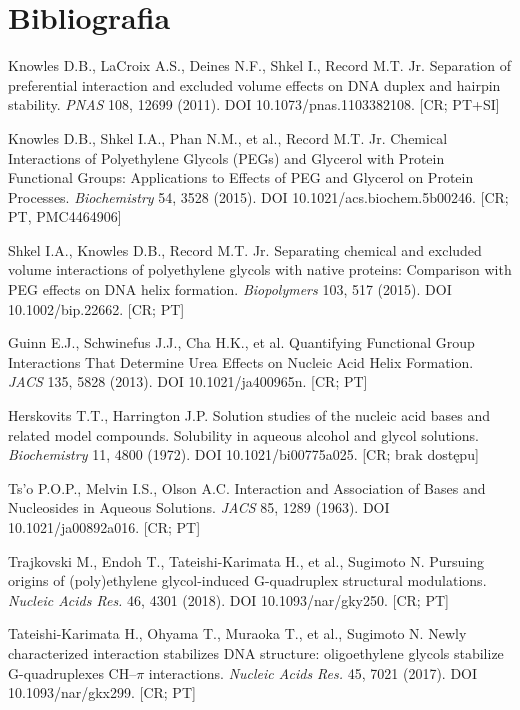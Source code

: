 \documentclass[10pt,a4paper]{article}
\begin{document}
\section*{Bibliografia}
\small
\begin{enumerate}[label={[\arabic*]},ref={\arabic*},leftmargin=*,itemsep=0pt]
\item\label{b:kn11} Knowles D.B., LaCroix A.S., Deines N.F., Shkel I., Record M.T. Jr. Separation of preferential interaction and excluded volume effects on DNA duplex and hairpin stability. \emph{PNAS} 108, 12699 (2011). DOI 10.1073/pnas.1103382108. [CR; PT+SI]
\item\label{b:kn15} Knowles D.B., Shkel I.A., Phan N.M., et al., Record M.T. Jr. Chemical Interactions of Polyethylene Glycols (PEGs) and Glycerol with Protein Functional Groups: Applications to Effects of PEG and Glycerol on Protein Processes. \emph{Biochemistry} 54, 3528 (2015). DOI 10.1021/acs.biochem.5b00246. [CR; PT, PMC4464906]
\item\label{b:shkel} Shkel I.A., Knowles D.B., Record M.T. Jr. Separating chemical and excluded volume interactions of polyethylene glycols with native proteins: Comparison with PEG effects on DNA helix formation. \emph{Biopolymers} 103, 517 (2015). DOI 10.1002/bip.22662. [CR; PT]
\item\label{b:guinn} Guinn E.J., Schwinefus J.J., Cha H.K., et al. Quantifying Functional Group Interactions That Determine Urea Effects on Nucleic Acid Helix Formation. \emph{JACS} 135, 5828 (2013). DOI 10.1021/ja400965n. [CR; PT]
\item\label{b:hersk72} Herskovits T.T., Harrington J.P. Solution studies of the nucleic acid bases and related model compounds. Solubility in aqueous alcohol and glycol solutions. \emph{Biochemistry} 11, 4800 (1972). DOI 10.1021/bi00775a025. [CR; brak dostępu]
\item\label{b:tso63} Ts'o P.O.P., Melvin I.S., Olson A.C. Interaction and Association of Bases and Nucleosides in Aqueous Solutions. \emph{JACS} 85, 1289 (1963). DOI 10.1021/ja00892a016. [CR; PT]
\item\label{b:traj} Trajkovski M., Endoh T., Tateishi-Karimata H., et al., Sugimoto N. Pursuing origins of (poly)ethylene glycol-induced G-quadruplex structural modulations. \emph{Nucleic Acids Res.} 46, 4301 (2018). DOI 10.1093/nar/gky250. [CR; PT]
\item\label{b:tateishi} Tateishi-Karimata H., Ohyama T., Muraoka T., et al., Sugimoto N. Newly characterized interaction stabilizes DNA structure: oligoethylene glycols stabilize G-quadruplexes CH--$\pi$ interactions. \emph{Nucleic Acids Res.} 45, 7021 (2017). DOI 10.1093/nar/gkx299. [CR; PT]

\end{enumerate}
\end{document}
